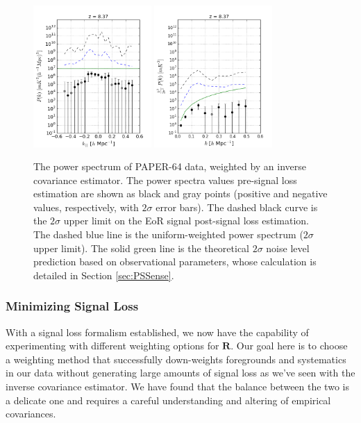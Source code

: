\documentclass[preprint2,numberedappendix,tighten]{aastex6}  %
\begin{document}
\begin{figure}
	\centering
	\includegraphics[width=0.4\textwidth]{plots/ps1_data.png}
	\includegraphics[width=0.4\textwidth]{plots/ps2_data.png}
	\caption{The power spectrum of PAPER-64 data, weighted by an inverse covariance estimator. The power spectra values pre-signal loss estimation are shown as black and gray points (positive and negative values, respectively, 
with $2\sigma$ error bars). The dashed black curve is the $2\sigma$ upper limit on the EoR signal post-signal loss estimation. The dashed blue line is the uniform-weighted power 
spectrum ($2\sigma$ upper limit). The solid green line is the theoretical $2\sigma$ noise level prediction based on observational 
parameters, whose calculation is detailed in Section \ref{sec:PSSense}.}
	\label{fig:ps2_data}
\end{figure}


\subsubsection{Minimizing Signal Loss}
\label{sec:Weight}

With a signal loss formalism established, we now have the capability of experimenting 
with different weighting options for $\textbf{R}$. Our goal here is to choose a weighting method that successfully down-weights 
foregrounds and systematics in our data without generating large amounts of signal loss as we've seen with the inverse covariance estimator. We have found that the balance 
between the two is a delicate one and requires a careful understanding and altering of empirical covariances. 
\end{document}
